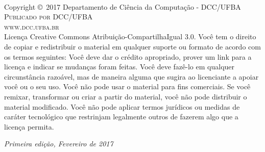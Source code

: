 
\newpage
~\vfill
\thispagestyle{empty}

\noindent Copyright \copyright\ 2017 Departamento de Ciência da Computação - DCC/UFBA\\ %

\noindent \textsc{Publicado por DCC/UFBA}\\ %

\noindent \textsc{www.dcc.ufba.br}\\ %

\noindent Licença Creative Commons Atribuição-CompartilhaIgual 3.0. Você tem o direito de copiar e redistribuir o material em qualquer suporte ou formato de acordo com os termos seguintes: Você deve dar o crédito apropriado, prover um link para a licença e indicar se mudanças foram feitas. Você deve fazê-lo em qualquer circunstância razoável, mas de maneira alguma que sugira ao licenciante a apoiar você ou o seu uso. Você não pode usar o material para fins comerciais. Se você remixar, transformar ou criar a partir do material, você não pode distribuir o material modificado. Você não pode aplicar termos jurídicos ou medidas de caráter tecnológico que restrinjam legalmente outros de fazerem algo que a licença permita.

\noindent \textit{Primeira edição, Fevereiro de 2017} %